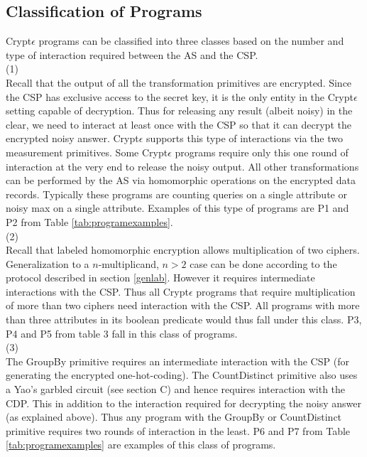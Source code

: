 \subsection{Classification of \system Programs}
Crypt$\epsilon$ programs can be classified into three classes based on the number and type of interaction required between the \textsf{AS} and the \textsf{CSP}.  \\
(1)\\
Recall that the output of all the transformation primitives are encrypted.  Since  the \textsf{CSP} has exclusive access to the secret key, it is the only entity in the Crypt$\epsilon$ setting capable of decryption. Thus for releasing any result (albeit noisy) in the clear, we need to interact at least once with the \textsf{CSP} so that it can decrypt the encrypted noisy answer. Crypt$\epsilon$ supports this type of interactions via the two measurement primitives. Some Crypt$\epsilon$ programs require only this one round of interaction at the very end to release the noisy output. All other transformations can be performed by the \textsf{AS} via homomorphic operations on the encrypted data records. Typically these programs are counting queries on a single attribute or noisy max on a single attribute. Examples of this type of programs are P1 and P2 from Table \ref{tab:programexamples}.\\
(2)\\
Recall that labeled homomorphic encryption allows multiplication of two ciphers. Generalization to a $n$-multiplicand, $n > 2$ case can be done according to the protocol described in section \ref{genlab}. However it requires intermediate interactions with the \textsf{CSP}. Thus all Crypt$\epsilon$ programs that require multiplication of more than two ciphers need interaction with the \textsf{CSP}. 
All programs with more than three attributes in its boolean predicate would thus fall under this class. P3, P4 and P5 from table 3 fall in this class of \system programs.\\
(3)\\
 The \textsf{GroupBy} primitive requires an intermediate interaction with the \textsf{CSP} (for generating the encrypted one-hot-coding). The \textsf{CountDistinct} primitive also uses a Yao's garbled circuit (see section C) and hence requires  interaction with the \textsf{CDP}. This in addition to the interaction required for decrypting the noisy answer (as explained above). Thus any program with the \textsf{GroupBy} or \textsf{CountDistinct} primitive requires two rounds of interaction in the least. P6 and P7 from Table \ref{tab:programexamples} are examples of this class of \system programs. 
